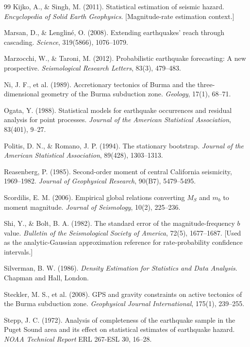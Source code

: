 \documentclass[10pt,a4paper,twocolumn]{article}
\begin{document}
\begin{thebibliography}{99}
 Kijko, A., \& Singh, M. (2011). Statistical estimation of seismic hazard. \emph{Encyclopedia of Solid Earth Geophysics}. [Magnitude-rate estimation context.]

 Marsan, D., \& Lenglin\'e, O. (2008). Extending earthquakes' reach through cascading. \emph{Science}, 319(5866), 1076--1079.

 Marzocchi, W., \& Taroni, M. (2012). Probabilistic earthquake forecasting: A new prospective. \emph{Seismological Research Letters}, 83(3), 479--483.

 Ni, J. F., et al. (1989). Accretionary tectonics of Burma and the three-dimensional geometry of the Burma subduction zone. \emph{Geology}, 17(1), 68--71.

 Ogata, Y. (1988). Statistical models for earthquake occurrences and residual analysis for point processes. \emph{Journal of the American Statistical Association}, 83(401), 9--27.

 Politis, D. N., \& Romano, J. P. (1994). The stationary bootstrap. \emph{Journal of the American Statistical Association}, 89(428), 1303--1313.

 Reasenberg, P. (1985). Second-order moment of central California seismicity, 1969--1982. \emph{Journal of Geophysical Research}, 90(B7), 5479--5495.

 Scordilis, E. M. (2006). Empirical global relations converting $M_S$ and $m_b$ to moment magnitude. \emph{Journal of Seismology}, 10(2), 225--236.

 Shi, Y., \& Bolt, B. A. (1982). The standard error of the magnitude-frequency $b$ value. \emph{Bulletin of the Seismological Society of America}, 72(5), 1677--1687. [Used as the analytic-Gaussian approximation reference for rate-probability confidence intervals.]

 Silverman, B. W. (1986). \emph{Density Estimation for Statistics and Data Analysis}. Chapman and Hall, London.

 Steckler, M. S., et al. (2008). GPS and gravity constraints on active tectonics of the Burma subduction zone. \emph{Geophysical Journal International}, 175(1), 239--255.

 Stepp, J. C. (1972). Analysis of completeness of the earthquake sample in the Puget Sound area and its effect on statistical estimates of earthquake hazard. \emph{NOAA Technical Report} ERL 267-ESL 30, 16--28.


\end{thebibliography}
\end{document}
